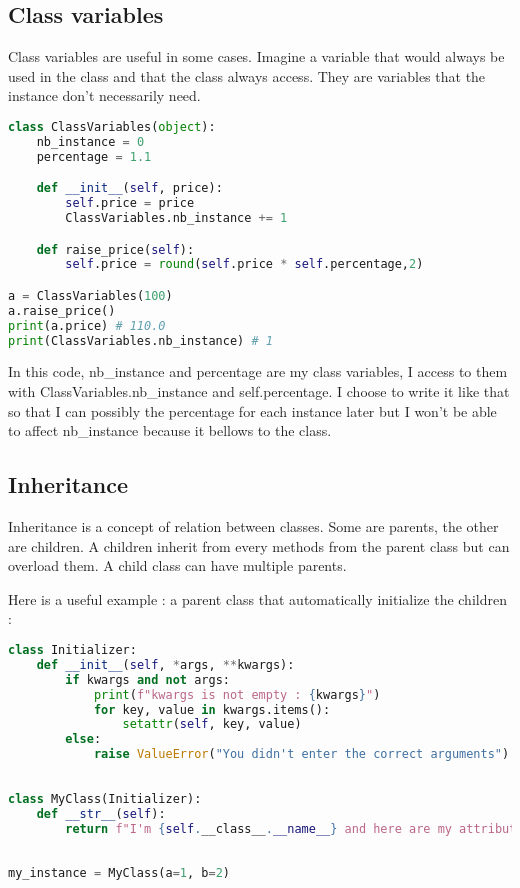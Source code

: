 \documentclass[a4paper, 12pt, titlepage]{scrartcl} %
\begin{document}
\subsection{Class variables}
Class variables are useful in some cases. Imagine a variable that would always be used in the class and that the class always access. They are variables that the instance don't necessarily need.
\begin{lstlisting}[language=Python]
class ClassVariables(object):
	nb_instance = 0
	percentage = 1.1

	def __init__(self, price):
		self.price = price
		ClassVariables.nb_instance += 1

	def raise_price(self):
		self.price = round(self.price * self.percentage,2)

a = ClassVariables(100)
a.raise_price()
print(a.price) # 110.0
print(ClassVariables.nb_instance) # 1
\end{lstlisting} \vspace{5mm}
In this code, nb\_instance and percentage are my class variables, I access to them with ClassVariables.nb\_instance and self.percentage. I choose to write it like that so that I can possibly the percentage for each instance later but I won't be able to affect nb\_instance because it bellows to the class.

\subsection{Inheritance}
Inheritance is a concept of relation between classes. Some are parents, the other are children. A children inherit from every methods from the parent class but can overload them. A child class can have multiple parents.

\vspace{5mm}

Here is a useful example : a parent class that automatically initialize the children :

\begin{lstlisting}[language=Python]
class Initializer:
    def __init__(self, *args, **kwargs):
        if kwargs and not args:
            print(f"kwargs is not empty : {kwargs}")
            for key, value in kwargs.items():
                setattr(self, key, value)
        else:
            raise ValueError("You didn't enter the correct arguments")
 
 
class MyClass(Initializer):
    def __str__(self):
        return f"I'm {self.__class__.__name__} and here are my attributes : {self.__dict__}"
 
 
my_instance = MyClass(a=1, b=2)
\end{lstlisting} \vspace{5mm}
\end{document}
